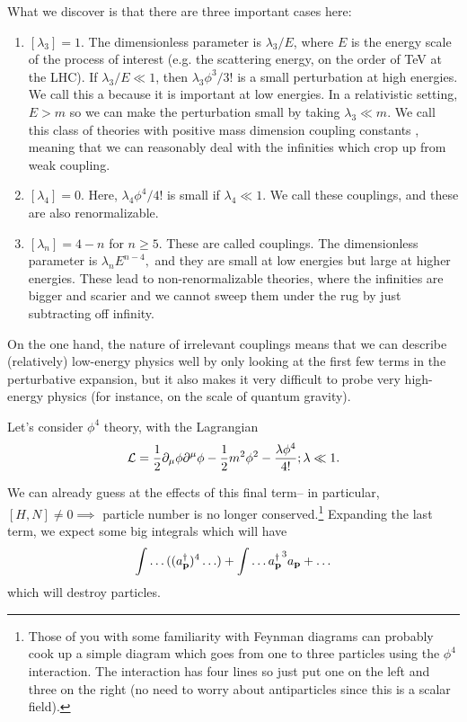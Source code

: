 What we discover is that there are three important cases here:
\begin{enumerate}
    \item $[\lambda_3]=1$. The dimensionless parameter is $\lambda_3/E$, where $E$ is the energy scale of the process of interest (e.g. the scattering energy, on the order of TeV at the LHC). If $\lambda_3/E \ll 1$, then $\lambda_3 \phi^3/3!$ is a small perturbation at high energies. We call this a  because it is important at low  energies. In a relativistic setting, $E>m$ so we can make the perturbation small by taking $\lambda_3\ll m$. We call this class of theories with positive mass dimension coupling constants , meaning that we can reasonably deal with the infinities which crop up from weak coupling.
    \item $[\lambda_4]=0$. Here, $\lambda_4 \phi^4/4!$ is small if $\lambda_4 \ll 1$. We call these  couplings, and these are also renormalizable.
    \item $[\lambda_n]=4-n$ for $n\geq 5$. These are called  couplings. The dimensionless parameter is $\lambda_n E^{n-4},$ and they are small at low energies but large at higher energies. These lead to non-renormalizable theories, where the infinities are bigger and scarier and we cannot sweep them under the rug by just subtracting off infinity.
\end{enumerate}
On the one hand, the nature of irrelevant couplings means that we can describe (relatively) low-energy physics well by only looking at the first few terms in the perturbative expansion, but it also makes it very difficult to probe very high-energy physics (for instance, on the scale of quantum gravity).
\begin{exm}
Let's consider $\phi^4$ theory, with the Lagrangian
$$\mathcal L = \frac{1}{2}\partial_\mu \phi \partial^\mu \phi -\frac{1}{2}m^2\phi^2-\frac{\lambda\phi^4}{4!}; \lambda \ll 1.$$

We can already guess at the effects of this final term-- in particular,
$[H,N]\neq 0\implies$ particle number is no longer conserved.\footnote{Those of you with some familiarity with Feynman diagrams can probably cook up a simple diagram which goes from one to three particles using the $\phi^4$ interaction. The interaction has four lines so just put one on the left and three on the right (no need to worry about antiparticles since this is a scalar field).} Expanding the last term, we expect some big integrals which will have
$$\int \ldots ((a_{\boldsymbol{\mathbf{p}}}^\dagger)^4 \ldots) +\int \ldots {a_{\boldsymbol{\mathbf{p}}}^\dagger}^3 a_{\boldsymbol{\mathbf{p}}}+\ldots$$
which will destroy particles.
\end{exm}

